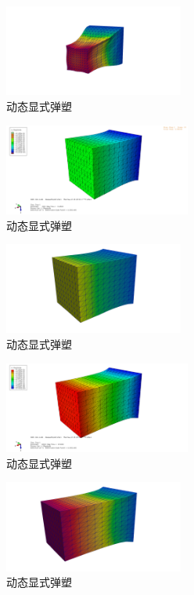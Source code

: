 \begin{figure}[!htbp]
  \centering
  \includegraphics[height=3cm]{fig/4/4.1.5/4-1.png}
  \caption{动态显式弹塑}
  \label{fig:4.1.4:4}
\end{figure}

\begin{figure}[!htbp]
  \centering
  \includegraphics[height=3cm]{fig/4/4.1.5/5.png}
  \caption{动态显式弹塑}
  \label{fig:4.1.4:4}
\end{figure}

\begin{figure}[!htbp]
  \centering
  \includegraphics[height=3cm]{fig/4/4.1.5/5-1.png}
  \caption{动态显式弹塑}
  \label{fig:4.1.4:4}
\end{figure}

\begin{figure}[!htbp]
  \centering
  \includegraphics[height=3cm]{fig/4/4.1.5/6.png}
  \caption{动态显式弹塑}
  \label{fig:4.1.4:4}
\end{figure}

\begin{figure}[!htbp]
  \centering
  \includegraphics[height=3cm]{fig/4/4.1.5/6-1.png}
  \caption{动态显式弹塑}
  \label{fig:4.1.4:4}
\end{figure}

